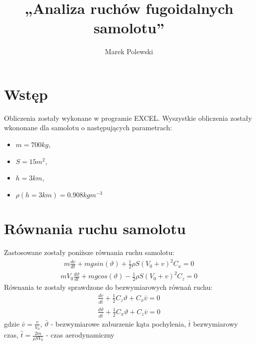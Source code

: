 \documentclass{sprawozdanie}
\title{„Analiza ruchów fugoidalnych samolotu”}
\author{Marek Polewski}
\begin{document}
\maketitle

\leavevmode\thispagestyle{empty}
\newpage


\tableofcontents

\FloatBarrier
\setcounter{page}{1}



\section{Wstęp}
Obliczenia zostały wykonane w programie EXCEL. Wyszystkie obliczenia zostały wkononane dla samolotu o następujących parametrach:
\begin{itemize}
    \item $m = 700kg$,
    \item $S = 15 m^2$,
    \item $h = 3km$,
    \item $\rho(h = 3km) = 0.908 kgm^{-3}$
\end{itemize}

\section{Równania ruchu samolotu}
Zastosowane zostały poniższe równania ruchu samolotu:
\begin{align}
    m \frac{dv}{dt} + mg sin(\vartheta) + \frac{1}{2}\rho S(V_0+v)^2 C_x = 0
\end{align}
\begin{align}
    mV_0 \frac{d\vartheta}{dt} + mg cos(\vartheta) - \frac{1}{2}\rho S(V_0+v)^2 C_z = 0
\end{align}
Równania te zostały sprawdzone do bezwymiarowych równań ruchu:
\begin{align}
    \frac{d\bar v}{d\bar t} + \frac{1}{2} C_z \vartheta + C_x \bar v = 0
\end{align}
\begin{align}
    \frac{d\bar \vartheta}{d\bar t} + \frac{1}{2} C_x \vartheta + C_z \bar v = 0
\end{align}
gdzie $\bar v = \frac{v}{V_0}$, $\bar \vartheta $ - bezwymiarowe zaburzenie kąta pochylenia, $\bar t$ bezwymiarowy czas, $\hat t = \frac{2m}{\rho S V_0}$ - czas aerodynamiczny
\end{document}
